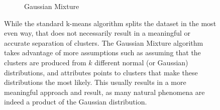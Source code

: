 \begin{figure}[!h]
\begin{subfigure}{0.4\textwidth}
    \caption{Gaussian Mixture}
  \end{subfigure}
  \caption{While the standard k-means algorithm splits the dataset in the most even way, that does not necessarily result in a meaningful or accurate separation of clusters. The Gaussian Mixture algorithm takes advantage of more assumptions such as assuming that the clusters are produced from $k$ different normal (or Gaussian) distributions, and attributes points to clusters that make these distributions the most likely. This usually results in a more meaningful approach and result, as many natural phenomena are indeed a product of the Gaussian distribution.}
  \label{fig:gaussian_mixture}
\end{figure}